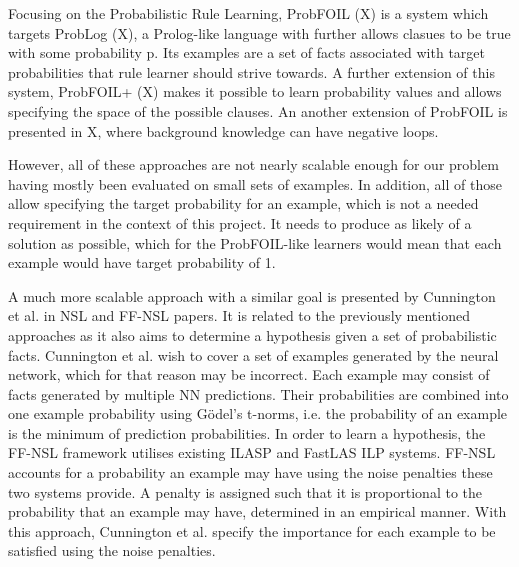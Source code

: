 Focusing on the Probabilistic Rule Learning, ProbFOIL (X) is a system which targets ProbLog (X), a Prolog-like language with further allows clasues to be true with some probability p.
Its examples are a set of facts associated with target probabilities that rule learner should strive towards.
A further extension of this system, ProbFOIL+ (X) makes it possible to learn probability values and allows specifying the space of the possible clauses.
An another extension of ProbFOIL is presented in X, where background knowledge can have negative loops.

However, all of these approaches are not nearly scalable enough for our problem having mostly been evaluated on small sets of examples.
In addition, all of those allow specifying the target probability for an example, which is not a needed requirement in the context of this project.
It needs to produce as likely of a solution as possible, which for the ProbFOIL-like learners would mean that each example would have target probability of 1.

A much more scalable approach with a similar goal is presented by Cunnington et al. in NSL and FF-NSL papers.
It is related to the previously mentioned approaches as it also aims to determine a hypothesis given a set of probabilistic facts.
Cunnington et al. wish to cover a set of examples generated by the neural network, which for that reason may be incorrect.
Each example may consist of facts generated by multiple NN predictions.
Their probabilities are combined into one example probability using G\"{o}del's t-norms, i.e. the probability of an example is the minimum of prediction probabilities.
In order to learn a hypothesis, the FF-NSL framework utilises existing ILASP \cite{RefWorks:RefID:54-ilasp} and FastLAS \cite{RefWorks:RefID:19-law2020fastlas:} ILP systems.
FF-NSL accounts for a probability an example may have using the noise penalties these two systems provide.
A penalty is assigned such that it is proportional to the probability that an example may have, determined in an empirical manner.
With this approach, Cunnington et al. specify the importance for each example to be satisfied using the noise penalties.
